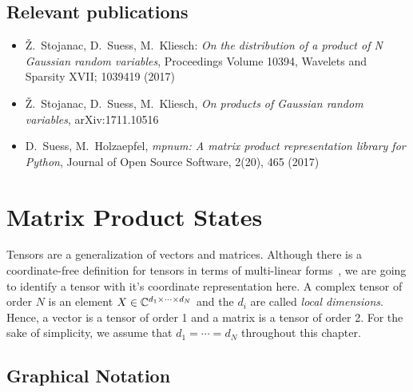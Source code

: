 \subsection*{Relevant publications}
\begin{itemize}
  \item Ž.\ Stojanac, D.\ Suess, M.\ Kliesch: \textit{On the distribution of a product of N Gaussian random variables}, Proceedings Volume 10394, Wavelets and Sparsity XVII; 1039419 (2017)
  \item Ž.\ Stojanac, D.\ Suess, M.\ Kliesch, \textit{On products of Gaussian random variables}, arXiv:1711.10516
  \item D.\ Suess, M.\ Holzaepfel, \textit{mpnum: A matrix product representation library for Python}, Journal of Open Source Software, 2(20), 465 (2017)
\end{itemize}
\section{Matrix Product States}%
\label{sec:tensors.mps}

Tensors are a generalization of vectors and matrices.
Although there is a coordinate-free definition for tensors in terms of multi-linear forms~\cite{BROUWER?}, we are going to identify a tensor with it's coordinate representation here.
A complex tensor of order $N$ is an element $X \in {\mathbb{C}}^{d_1 \times \cdots \times d_N}$ and the $d_i$ are called \emph{local dimensions}.
Hence, a vector is a tensor of order 1 and a matrix is a tensor of order 2.
For the sake of simplicity, we assume that $d_1 = \cdots = d_N$ throughout this chapter.



\subsection{Graphical Notation}
\label{sub:mps.graphical_notation}

